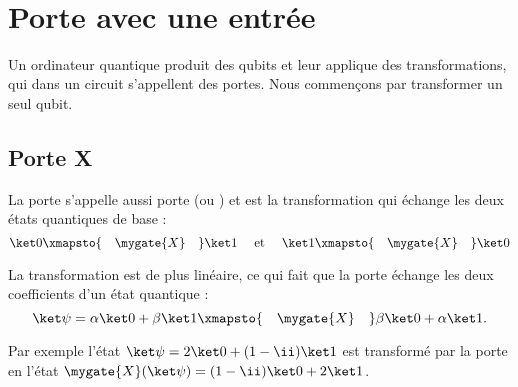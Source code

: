 \documentclass[11pt,class=report,crop=false]{standalone}
\begin{document}
~

\section{Porte avec une entrée}

Un ordinateur quantique produit des qubits et leur applique des transformations, qui dans un circuit s'appellent des \og{}portes\fg{}. Nous commençons par transformer un seul qubit. 

\subsection{Porte X}

La porte  s'appelle aussi porte  (ou ) et est la transformation qui échange les deux états quantiques de base :
$$\ket 0 \xmapsto{\quad\mygate{X}\quad} \ket 1 \quad \text{ et } \quad \ket 1 \xmapsto{\quad\mygate{X}\quad} \ket 0$$




La transformation est de plus linéaire, ce qui fait que la porte  échange les deux coefficients d'un état quantique :
$$\ket\psi = \alpha  \ket 0 + \beta \ket 1 \xmapsto{\quad\mygate{X}\quad} \beta  \ket 0 + \alpha \ket 1.$$

Par exemple l'état $\ket \psi = 2\ket0 + (1-\ii)\ket1$
est transformé par la porte  en l'état $\mygate{X}(\ket \psi) 
= (1-\ii)\ket0 + 2\ket1$.
\end{document}
